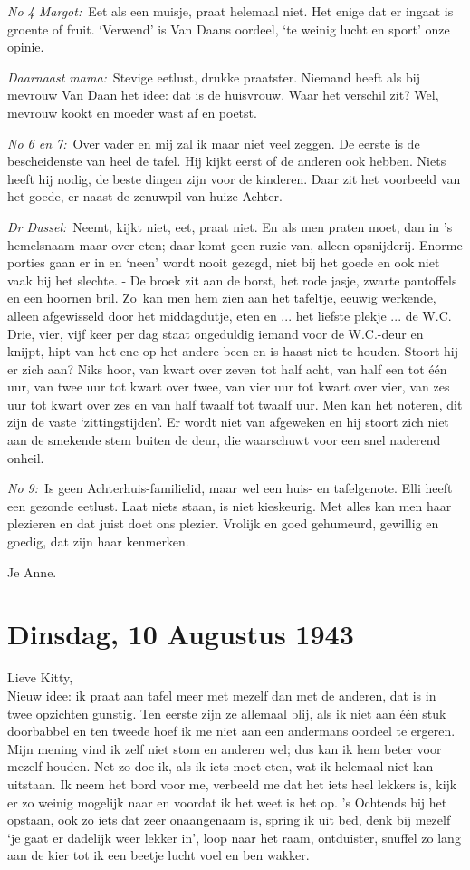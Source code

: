 \documentclass{book}
\begin{document}
\emph{No 4 Margot:}~Eet als een muisje, praat helemaal niet. Het enige dat er
ingaat is groente of fruit. `Verwend' is Van Daans oordeel, `te weinig lucht en
sport' onze opinie.

\emph{Daarnaast mama:}~Stevige eetlust, drukke praatster. Niemand heeft als bij
mevrouw Van Daan het idee: dat is de huisvrouw. Waar het verschil zit? Wel,
mevrouw kookt en moeder wast af en poetst.

\emph{No 6 en 7:}~Over vader en mij zal ik maar niet veel zeggen. De eerste is
de bescheidenste van heel de tafel. Hij kijkt eerst of de anderen ook hebben.
Niets heeft hij nodig, de beste dingen zijn voor de kinderen. Daar zit het
voorbeeld van het goede, er naast de zenuwpil van huize Achter.

\emph{Dr Dussel:}~Neemt, kijkt niet, eet, praat niet. En als men praten moet,
dan in 's hemelsnaam maar over eten; daar komt geen ruzie van, alleen
opsnijderij. Enorme porties gaan er in en `neen' wordt nooit gezegd, niet bij
het goede en ook niet vaak bij het slechte. - De broek zit aan de borst, het
rode jasje, zwarte pantoffels en een hoornen bril.  Zo~kan men hem zien aan het
tafeltje, eeuwig werkende, alleen afgewisseld door het middagdutje, eten en ...
het liefste plekje ... de W.C. Drie, vier, vijf keer per dag staat ongeduldig
iemand voor de W.C.-deur en knijpt, hipt van het ene op het andere been en is
haast niet te houden. Stoort hij er zich aan? Niks hoor, van kwart over zeven
tot half acht, van half een tot één uur, van twee uur tot kwart over twee, van
vier uur tot kwart over vier, van zes uur tot kwart over zes en van half twaalf
tot twaalf uur. Men kan het noteren, dit zijn de vaste `zittingstijden'. Er
wordt niet van afgeweken en hij stoort zich niet aan de smekende stem buiten de
deur, die waarschuwt voor een snel naderend onheil.

\emph{No 9:}~Is geen Achterhuis-familielid, maar wel een huis- en tafelgenote.
Elli heeft een gezonde eetlust. Laat niets staan, is niet kieskeurig. Met alles
kan men haar plezieren en dat juist doet ons plezier. Vrolijk en goed gehumeurd,
gewillig en goedig, dat zijn haar kenmerken.

Je Anne.

\section*{Dinsdag, 10 Augustus 1943}

Lieve Kitty,\\
Nieuw idee: ik praat aan tafel meer met mezelf dan met de
anderen, dat is in twee opzichten gunstig. Ten eerste zijn ze allemaal blij, als
ik niet aan één stuk doorbabbel en ten tweede hoef ik me niet aan een andermans
oordeel te ergeren. Mijn mening vind ik zelf niet stom en anderen wel; dus kan
ik hem beter voor mezelf houden. Net zo doe ik, als ik iets moet eten, wat ik
helemaal niet kan uitstaan. Ik neem het bord voor me, verbeeld me dat het iets
heel lekkers is, kijk er zo weinig mogelijk naar en voordat ik het weet is het
op. 's Ochtends bij het opstaan, ook zo iets dat zeer onaangenaam is, spring ik
uit bed, denk bij mezelf `je gaat er dadelijk weer lekker in', loop naar het
raam, ontduister, snuffel zo lang aan de kier tot ik een beetje lucht voel en
ben wakker.
\end{document}
